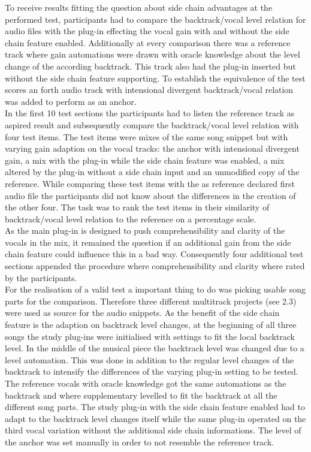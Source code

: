 To receive results fitting the question about side chain advantages at the performed test, participants had to compare the backtrack/vocal level relation for audio files with the plug-in effecting the vocal gain with and without the side chain feature enabled. Additionally at every comparison there was a reference track where gain automations were drawn with oracle knowledge about the level change of the according backtrack. This track also had the plug-in inserted but without the side chain feature supporting. To establish the equivalence of the test scores an forth audio track with intensional divergent backtrack/vocal relation was added to perform as an anchor.\\
In the first 10 test sections the participants had to listen the reference track as aspired result and subsequently compare the backtrack/vocal level relation with four test items. The test items were mixes of the same song snippet but with varying gain adaption on the vocal tracks: the anchor with intensional divergent gain, a mix with the plug-in while the side chain feature was enabled, a mix altered by the plug-in without a side chain input and an unmodified copy of the reference. While comparing these test items with the as reference declared first audio file the participants did not know about the differences in the creation of the other four. The task was to rank the test items in their similarity of backtrack/vocal level relation to the reference on a percentage scale.\\
As the main plug-in is designed to push comprehensibility and clarity of the vocals in the mix, it remained the question if an additional gain from the side chain feature could influence this in a bad way. Consequently four additional test sections appended the procedure where comprehensibility and clarity where rated by the participants.\\
For the realisation of a valid test a important thing to do was picking usable song parts for the comparison. Therefore three different multitrack projects (see 2.3) were used as source for the audio snippets. As the benefit of the side chain feature is the adaption on backtrack level changes, at the beginning of all three songs the study plug-ins were initialised with settings to fit the local backtrack level. In the middle of the musical piece the backtrack level was changed due to a level automation. This was done in addition to the regular level changes of the backtrack to intensify the differences of the varying plug-in setting to be tested. The reference vocals with oracle knowledge got the same automations as the backtrack and where supplementary levelled to fit the backtrack at all the different song parts. The study plug-in with the side chain feature enabled had to adapt to the backtrack level changes itself while the same plug-in operated on the third vocal variation without the additional side chain informations. The level of the anchor was set manually in order to not resemble the reference track.\\
